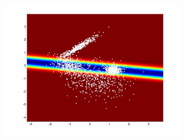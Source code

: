 \documentclass[useAMS,usenatbib,fleqn]{mn2e}
\begin{document}
\begin{figure}
\begin{subfigure}[b]{90 px}
                \includegraphics[trim = 150px 100px 150px 70px, clip=true,width=\textwidth]{VC1.jpg}
        \end{subfigure}
       

\end{figure}
\end{document}
